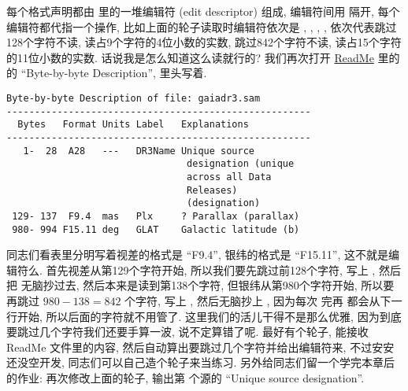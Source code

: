 每个格式声明都由 \ttt{()} 里的一堆编辑符 (edit descriptor) 组成, 编辑符间用 \ttt{,} 隔开, 每个编辑符都代指一个操作, 比如上面的轮子读取时编辑符依次是 , , , , 依次代表跳过128个字符不读, 读占9个字符的4位小数的实数, 跳过842个字符不读, 读占15个字符的11位小数的实数. 话说我是怎么知道这么读就行的? 我们再次打开 \href{https://cdsarc.cds.unistra.fr/viz-bin/ReadMe/I/355?format=html&tex=true}{ReadMe} 里的  的 ``Byte-by-byte Description'', 里头写着. 
\begin{lstlisting}[numbers=none]
Byte-by-byte Description of file: gaiadr3.sam 
------------------------------------------------------
  Bytes   Format Units Label   Explanations
------------------------------------------------------
   1-  28  A28   ---   DR3Name Unique source
                                designation (unique
                                across all Data
                                Releases)
                                (designation)
 129- 137  F9.4  mas   Plx     ? Parallax (parallax)
 980- 994 F15.11 deg   GLAT    Galactic latitude (b)
\end{lstlisting}
同志们看表里分明写着视差的格式是 ``F9.4'', 银纬的格式是 ``F15.11'', 这不就是编辑符么. 首先视差从第129个字符开始, 所以我们要先跳过前128个字符, 写上 , 然后把  无脑抄过去, 然后本来是读到第138个字符, 但银纬从第980个字符开始, 所以要再跳过 $ 980-138=842 $ 个字符, 写上 , 然后无脑抄上 , 因为每次  完再  都会从下一行开始, 所以后面的字符就不用管了. 这里我们的活儿干得不是那么优雅, 因为到底要跳过几个字符我们还要手算一波, 说不定算错了呢. 最好有个轮子, 能接收 ReadMe 文件里的内容, 然后自动算出要跳过几个字符并给出编辑符来, 不过安安还没空开发, 同志们可以自己造个轮子来当练习. 另外给同志们留一个学完本章后的作业: 再次修改上面的轮子, 输出第  个源的 ``Unique source designation''. 

